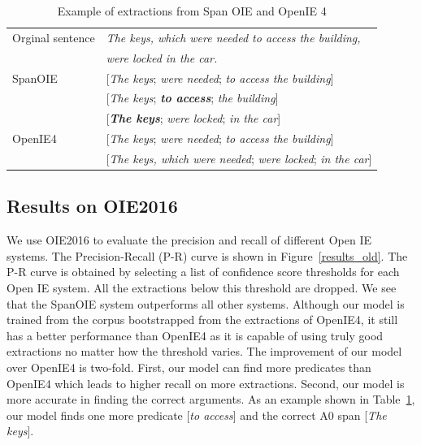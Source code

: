 \documentclass[letterpaper]{article} %
\begin{document}
\begin{table}[t!]
\begin{center}
\begin{tabular}{|l|l|}
\hline
Orginal sentence & \emph{The keys, which were needed to access the building,}\\
&  \emph{were locked in the car.}\\
\hline
SpanOIE & [\emph{The keys}; \emph{were needed}; \emph{to access the building}]\\
         & [\emph{The keys}; \emph{\textbf{to access}}; \emph{the building}]\\
         & [\emph{\textbf{The keys}}; \emph{were locked}; \emph{in the car}]\\
\hline
OpenIE4 & [\emph{The keys}; \emph{were needed}; \emph{to access the building}]\\
         & [\emph{The keys, which were needed}; \emph{were locked}; \emph{in the car}]\\
\hline
\end{tabular}
\end{center}
\caption{Example of extractions from Span OIE and OpenIE 4}
\label{examples}
\end{table}


\subsection{Results on OIE2016}
We use OIE2016 to evaluate the precision and recall of different Open IE systems. The Precision-Recall (P-R) curve is shown in Figure~\ref{results_old}. The P-R curve is obtained by selecting a list of confidence score thresholds for each Open IE system. All the extractions below this threshold are dropped. We see that the SpanOIE system outperforms all other systems. Although our model is trained from the corpus bootstrapped from the extractions of OpenIE4, it still has a better performance than OpenIE4 as it is capable of using truly good extractions no matter how the threshold varies. The improvement of our model over OpenIE4 is two-fold. First, our model can find more predicates than OpenIE4 which leads to higher recall on more extractions. Second, our model is more accurate in finding the correct arguments. As an example shown in Table~\ref{examples}, our model finds one more predicate [\emph{to access}] and the correct A0 span [\emph{The keys}].
\end{document}
